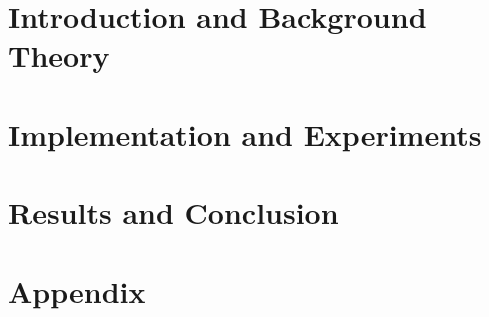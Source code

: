 
\addtolength{\evensidemargin}{-12mm}

%
%
\part{Introduction and Background Theory}
\label{part:introAndBackgroundTheory}





%
\part{Implementation and Experiments}
\label{part:experimentsAndResults}



\part[Results and Conclusion]{Results and Conclusion}
\label{part:resultsAndConclusion}




%
%

\part*{Appendix}

\appendix %

%
